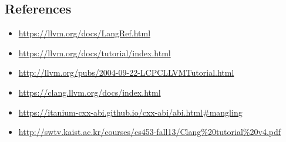 \documentclass[12pt]{article}
\begin{document}
\subsection{References}
\begin{itemize}
\item \href{https://llvm.org/docs/LangRef.html}{https://llvm.org/docs/LangRef.html}
\item \href{https://llvm.org/docs/tutorial/index.html}{https://llvm.org/docs/tutorial/index.html}
\item \href{http://llvm.org/pubs/2004-09-22-LCPCLLVMTutorial.html}{http://llvm.org/pubs/2004-09-22-LCPCLLVMTutorial.html}
\item \href{https://clang.llvm.org/docs/index.html}{https://clang.llvm.org/docs/index.html}
\item \href{https://itanium-cxx-abi.github.io/cxx-abi/abi.html\#mangling}{https://itanium-cxx-abi.github.io/cxx-abi/abi.html\#mangling}
\item \href{http://swtv.kaist.ac.kr/courses/cs453-fall13/Clang\%20tutorial\%20v4.pdf}{http://swtv.kaist.ac.kr/courses/cs453-fall13/Clang\%20tutorial\%20v4.pdf}
\end{itemize}
\end{document}
